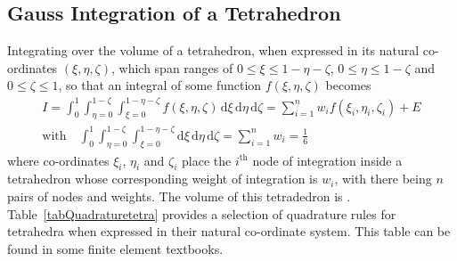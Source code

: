 \subsection{Gauss Integration of a Tetrahedron}

Integrating over the volume of a tetrahedron, when expressed in its natural co-ordinates $( \xi , \eta , \zeta )$, which span ranges of $0 \leq \xi \leq 1 - \eta - \zeta$, $0 \leq \eta \leq 1 - \zeta$ and $0 \leq \zeta \leq 1$, so that an integral of some function $f ( \xi , \eta , \zeta )$ becomes
\begin{multline}
     I = \int_0^1 \int_{\eta=0}^{1-\zeta} \int_{\xi = 0}^{1 - \eta - \zeta} 
     f ( \xi , \eta , \zeta ) \, \mathrm{d} \xi \, \mathrm{d} \eta \, 
     \mathrm{d} \zeta = \sum_{i=1}^n w_i f( \xi_i , \eta_i , \zeta_i ) + E \\
     \text{with} \quad 
     \int_0^1 \int_{\eta=0}^{1-\zeta} \int_{\xi = 0}^{1 - \eta - \zeta} 
     \mathrm{d} \xi \, \mathrm{d} \eta \, \mathrm{d} \zeta = \sum_{i=1}^n w_i = 
     \frac{1}{6}
\end{multline}
where co-ordinates $\xi_i$, $\eta_i$ and $\zeta_i$ place the $i^{\text{th}}$ node of integration inside a tetrahedron whose corresponding weight of integration is $w_i$, with there being $n$ pairs of nodes and weights.  The volume of this tetradedron is .  Table~\ref{tabQuadraturetetra} provides a selection of quadrature rules for tetrahedra when expressed in their natural co-ordinate system.  This table can be found in some finite element textbooks.

